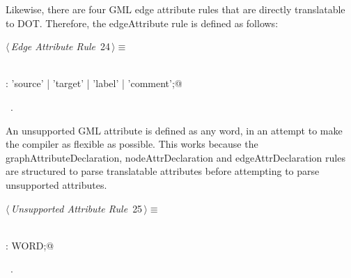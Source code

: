 \documentclass[a4paper]{report}
\begin{document}
Likewise, there are four GML edge attribute rules that are directly translatable to DOT. Therefore, the edgeAttribute rule is defined as follows:
\begin{flushleft} \small
\begin{minipage}{\linewidth}\label{scrap24}\raggedright\small
{} $\langle\,${\itshape Edge Attribute Rule}\nobreak\ {\footnotesize {24}}$\,\rangle\equiv$
\vspace{-1ex}
\begin{list}{}{} \item
\mbox{}\verb@@\\
\mbox{}\verb@edgeAttribute: 'source' | 'target' | 'label' | 'comment';@\\
\mbox{}\verb@@{\NWsep}
\end{list}
\vspace{-1.5ex}
\footnotesize
\begin{list}{}{\setlength{\itemsep}{-\parsep}\setlength{\itemindent}{-\leftmargin}}
\item \NWtxtMacroRefIn\ .

\item{}
\end{list}
\end{minipage}\vspace{4ex}
\end{flushleft}
An unsupported GML attribute is defined as any word, in an attempt to make the compiler as flexible as possible. This works because the
graphAttributeDeclaration, nodeAttrDeclaration and edgeAttrDeclaration rules are structured to parse translatable attributes before attempting to parse
unsupported attributes.
\begin{flushleft} \small
\begin{minipage}{\linewidth}\label{scrap25}\raggedright\small
{} $\langle\,${\itshape Unsupported Attribute Rule}\nobreak\ {\footnotesize {25}}$\,\rangle\equiv$
\vspace{-1ex}
\begin{list}{}{} \item
\mbox{}\verb@@\\
\mbox{}\verb@nonTranslatableAttribute:  WORD;@\\
\mbox{}\verb@@{\NWsep}
\end{list}
\vspace{-1.5ex}
\footnotesize
\begin{list}{}{\setlength{\itemsep}{-\parsep}\setlength{\itemindent}{-\leftmargin}}
\item \NWtxtMacroRefIn\ .

\item{}
\end{list}
\end{minipage}\vspace{4ex}
\end{flushleft}
\end{document}
